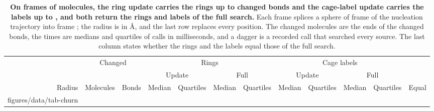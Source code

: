 \documentclass[preprint,12pt]{elsarticle}
\makeatletter
\newcommand{\tabbody}[1]{\@@input #1 }
\makeatother
\begin{document}
\begin{table}
\centering \caption{\textbf{On frames of  molecules, the ring
update carries the rings up to  changed bonds and
the cage-label update carries the labels up to ,
and both return the rings and labels of the full search.} Each frame
splices a sphere of frame  of the nucleation trajectory
into frame ; the radius is in \unit{\angstrom}, and the
last row replaces every position. The changed molecules are the ends of
the changed bonds, the times are medians and quartiles of 
calls in milliseconds, and a dagger is a recorded call that searched
every source. The last column states whether the rings and the labels
equal those of the full search.}
\label{tab:s-churn} \footnotesize \setlength{\tabcolsep}{4pt}
\begin{tabular}{@{}rrrrcrcrcrcc@{}}
\toprule
 & \multicolumn{2}{c}{Changed} & \multicolumn{4}{c}{Rings} & \multicolumn{4}{c}{Cage labels} & \\
\cmidrule(lr){2-3}\cmidrule(lr){4-7}\cmidrule(lr){8-11}
 & & & \multicolumn{2}{c}{Update} & \multicolumn{2}{c}{Full} & \multicolumn{2}{c}{Update} & \multicolumn{2}{c}{Full} & \\
\cmidrule(lr){4-5}\cmidrule(lr){6-7}\cmidrule(lr){8-9}\cmidrule(lr){10-11}
Radius & Molecules & Bonds & Median & Quartiles & Median & Quartiles & Median & Quartiles & Median & Quartiles & Equal \\
\midrule
\tabbody{figures/data/tab-churn}
\bottomrule
\end{tabular}


\end{table}
\end{document}
